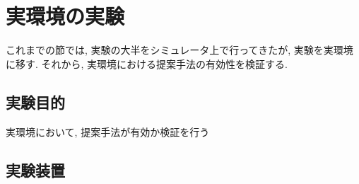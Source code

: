 
\section{実環境の実験}
これまでの節では, 実験の大半をシミュレータ上で行ってきたが, 実験を実環境に移す. それから, 実環境における提案手法の有効性を検証する.

\subsection{実験目的}
実環境において, 提案手法が有効か検証を行う

\subsection{実験装置}
